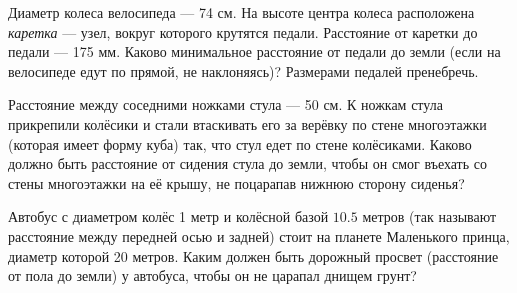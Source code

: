 ﻿
\begin{enumerate}

\itA Диаметр колеса велосипеда — 74 см. На высоте центра колеса расположена {\itshape каретка} — узел, вокруг которого крутятся педали. Расстояние от каретки до педали — 175 мм. Каково минимальное расстояние от педали до земли (если на велосипеде едут по прямой, не наклоняясь)? Размерами педалей пренебречь.

\itB Расстояние между соседними ножками стула — 50 см. К ножкам стула прикрепили колёсики и стали втаскивать его за верёвку по стене многоэтажки (которая имеет форму куба) так, что стул едет по стене колёсиками. Каково должно быть расстояние от сидения стула до земли, чтобы он смог въехать со стены многоэтажки на её крышу, не поцарапав нижнюю сторону сиденья?

\itC Автобус с диаметром колёс 1 метр и колёсной базой $10.5$ метров (так называют расстояние между передней осью и задней) стоит на планете Маленького принца, диаметр которой 20 метров. Каким должен быть дорожный просвет (расстояние от пола до земли) у автобуса, чтобы он не царапал днищем грунт?
\end{enumerate}